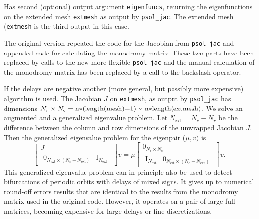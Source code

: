 \documentclass[11pt]{scrartcl}
\newcommand{\mt}[1]{\mathrm{#1}}
\newcommand{\id}{\mt{I}}
\newcommand{\mlvar}[1]{\lstinline[keywordstyle=\color{var}]!#1!}
\newcommand{\blist}[1]{\mbox{\lstinline!#1!}}
\begin{document}
\begin{compactitem}
\item Has second (optional) output argument \mlvar{eigenfuncs},
  returning the eigenfunctions on the extended mesh \mlvar{extmesh}
  as output by \blist{psol_jac}. The extended mesh (\mlvar{extmesh}
  is the third output in this case.
\item The original version repeated the code for the Jacobian from
  \blist{psol_jac} and appended code for calculating the monodromy
  matrix. These two parts have been replaced by calls to the new more
  flexible \blist{psol_jac} and the manual calculation of the
  monodromy matrix has been replaced by a call to the backslash
  operator.
\item If the delays are negative another (more general, but possibly
  more expensive) algorithm is used. The Jacobian $J$ on
  \mlvar{extmesh}, as output by \mlvar{psol_jac} has dimensions
  $N_r\times
  N_c=\blist{n*(length(mesh)-1)}\times\blist{n*length(extmesh)}$.  We
  solve an augmented and a generalized eigenvalue problem. Let
  $N_\mt{ext}=N_c-N_r$ be the difference between the column and row
  dimensions of the unwrapped Jacobian $J$. Then the generalized
  eigenvalue problem for the eigenpair ($\mu,v)$ is
  \begin{displaymath}
    \begin{bmatrix}
      J\\
      \begin{matrix}
       0_{N_\mt{ext}\times (N_c-N_\mt{ext})}& \id_{N_\mt{ext}} 
      \end{matrix}
    \end{bmatrix}
    v=\mu
    \begin{bmatrix}
      0_{N_r\times N_c}\\
      \begin{matrix}
        \id_{N_\mt{ext}} & 0_{N_\mt{ext}\times (N_c-N_\mt{ext})}
      \end{matrix}
    \end{bmatrix}v\mbox{.}
  \end{displaymath}
  This generalized eigenvalue problem can in principle also be used to
  detect bifurcations of periodic orbits with delays of mixed
  signs. It gives up to numerical round-off errors results that are
  identical to the results from the monodromy matrix used in the
  original code. However, it operates on a pair of large full
  matrices, becoming expensive for large delays or fine
  discretizations.
\end{compactitem}
\end{document}
